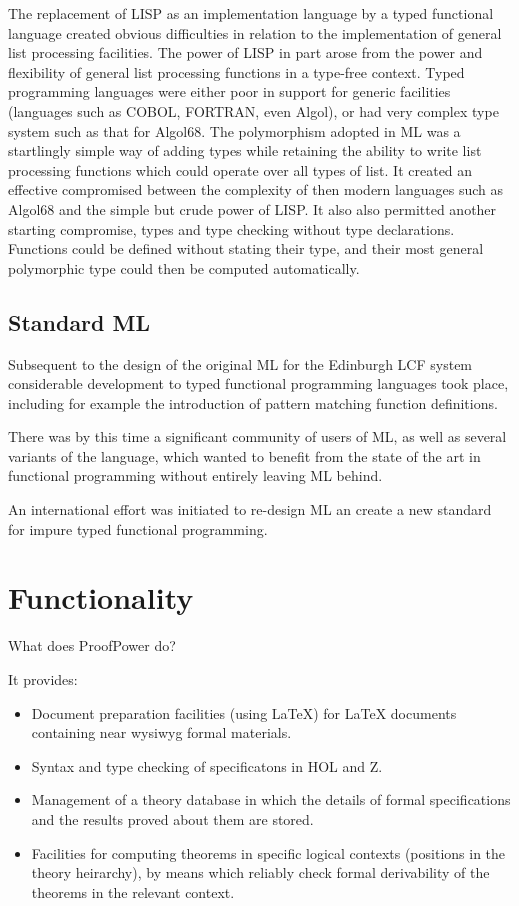 \documentclass{rbjk}
\begin{document}
\begin{article}
The replacement of LISP as an implementation language by a typed
functional language created obvious difficulties in relation to the
implementation of general list processing facilities.
The power of LISP in part arose from the power and flexibility of
general list processing functions in a type-free context.
Typed programming languages were either poor in support for generic
facilities (languages such as COBOL, FORTRAN, even Algol), or had very
complex type system such as that for Algol68.
The polymorphism adopted in ML was a startlingly simple way of adding
types while retaining the ability to write list processing functions
which could operate over all types of list.
It created an effective compromised between the complexity
of then modern languages such as Algol68 and the simple but crude
power of LISP.
It also also permitted another starting compromise, types and type
checking without type declarations.
Functions could be defined without stating their type, and their most
general polymorphic type could then be computed automatically.

\subsection{Standard ML}

Subsequent to the design of the original ML for the Edinburgh LCF
system considerable development to typed functional programming
languages took place, including for example the introduction of 
pattern matching function definitions.

There was by this time a significant community of users of ML, as well
as several variants of the language, which wanted to benefit from the
state of the art in functional programming without entirely leaving ML
behind.

An international effort was initiated to re-design ML an create a new
standard for impure typed functional programming.

\section{Functionality}

What does ProofPower do?

It provides:
\begin{itemize}
\item Document preparation facilities (using \LaTeX) for \LaTeX
  documents containing near wysiwyg formal materials.
\item Syntax and type checking of specificatons in HOL and Z.
\item Management of a theory database in which the details of formal
  specifications and the results proved about them are stored.
\item Facilities for computing theorems in specific logical contexts
  (positions in the theory heirarchy), by means which reliably check
  formal derivability of the theorems in the relevant context.
\end{itemize}


\end{article}
\end{document}

